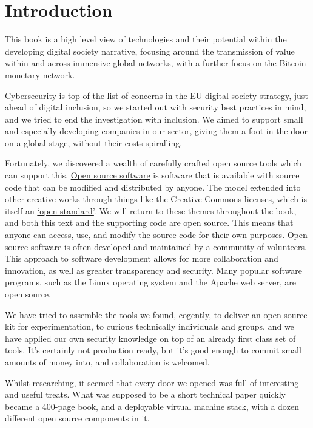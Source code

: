 \section{Introduction}
This book is a high level view of technologies and their potential within the developing digital society narrative, focusing around the transmission of value within and across immersive global networks, with a further focus on the Bitcoin monetary network.\par
Cybersecurity is top of the list of concerns in the \href{https://digital-strategy.ec.europa.eu/en/policies}{EU digital society strategy}, just ahead of digital inclusion, so we started out with security best practices in mind, and we tried to end the investigation with inclusion. We aimed to support small and especially developing companies in our sector, giving them a foot in the door on a global stage, without their costs spiralling.\par
Fortunately, we discovered a wealth of carefully crafted open source tools which can support this. \href{https://opensource.org/osd}{Open source software} is software that is available with source code that can be modified and distributed by anyone. The model extended into other creative works through things like the \href{https://creativecommons.org/licenses/}{Creative Commons} licenses, which is itself an \href{https://open-stand.org/about-us/principles/}{`open standard'}. We will return to these themes throughout the book, and both this text and the supporting code are open source. This means that anyone can access, use, and modify the source code for their own purposes. Open source software is often developed and maintained by a community of volunteers. This approach to software development allows for more collaboration and innovation, as well as greater transparency and security. Many popular software programs, such as the Linux operating system and the Apache web server, are open source.\par
We have tried to assemble the tools we found, cogently, to deliver an open source kit for experimentation, to curious technically individuals and groups, and we have applied our own security knowledge on top of an already first class set of tools. It’s certainly not production ready, but it's good enough to commit small amounts of money into, and collaboration is welcomed.\par
Whilst researching, it seemed that every door we opened was full of interesting and useful treats. What was supposed to be a short technical paper quickly became a 400-page book, and a deployable virtual machine stack, with a dozen different open source components in it. \par
